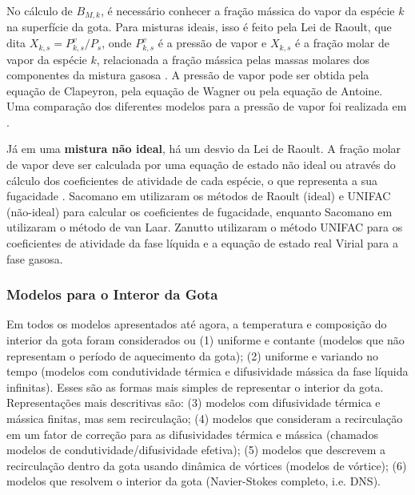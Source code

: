 No cálculo de $B_{M,k}$, é necessário conhecer a fração mássica do vapor da espécie $k$ na superfície da gota.
Para misturas ideais, isso é feito pela Lei de Raoult, que dita $X_{k,s}=P^v_{k,s}/P_s$, onde $P^v_{k,s}$ é a pressão de vapor e $X_{k,s}$ é a fração molar de vapor da espécie $k$, relacionada a fração mássica pelas massas molares dos componentes da mistura gasosa \cite{Peters2010}.
A pressão de vapor pode ser obtida pela equação de Clapeyron, pela equação de Wagner ou pela equação de Antoine.
Uma comparação dos diferentes modelos para a pressão de vapor foi realizada em \cite{SacomanoF2019IJHMT}.

Já em uma \textbf{mistura não ideal}, há um desvio da Lei de Raoult. 
A fração molar de vapor deve ser calculada por uma equação de estado não ideal ou através do cálculo dos coeficientes de atividade de cada espécie, o que representa a sua fugacidade \cite{Bird2002}.
Sacomano\etal{} em \cite{SacomanoF2022IJHMT} utilizaram os métodos de Raoult (ideal) e UNIFAC (não-ideal) para calcular os coeficientes de fugacidade, enquanto Sacomano\etal{} em \cite{SacomanoF2025CF} utilizaram o método de van Laar.
Zanutto\etal{} \cite{ZanuttoC2019} utilizaram o método UNIFAC para os coeficientes de atividade da fase líquida e a equação de estado real Virial para a fase gasosa.


\subsubsection{Modelos para o Interor da Gota} \label{sec:int}

Em todos os modelos apresentados até agora, a temperatura e composição do interior da gota foram considerados ou (1) uniforme e contante (modelos que não representam o período de aquecimento da gota); (2) uniforme e variando no tempo (modelos com condutividade térmica e difusividade mássica da fase líquida infinitas).
Esses são as formas mais simples de representar o interior da gota.
Representações mais descritivas são: (3) modelos com difusividade térmica e mássica finitas, mas sem recirculação; (4) modelos que consideram a recirculação em um fator de correção para as difusividades térmica e mássica (chamados modelos de condutividade/difusividade efetiva); (5) modelos que descrevem a recirculação dentro da gota usando dinâmica de vórtices (modelos de vórtice); (6) modelos que resolvem o interior da gota (Navier-Stokes completo, i.e. DNS). \cite{Sazhin2006}

